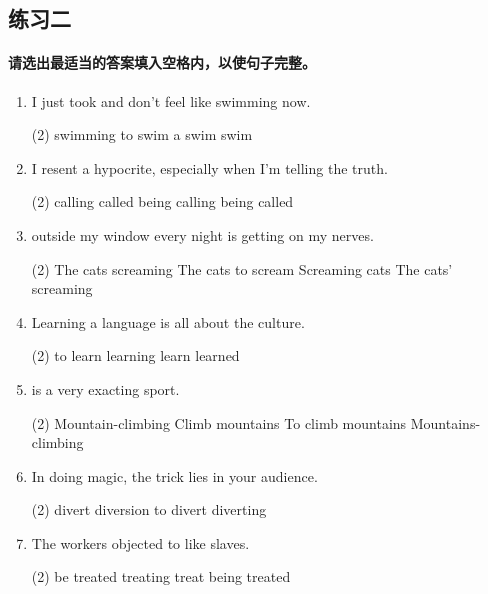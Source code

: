 \subsection{练习二}

\paragraph{请选出最适当的答案填入空格内，以使句子完整。}

\begin{enumerate}
\item I just took \ttu and don't feel like swimming now.
  \begin{tasks}(2)
    \task swimming
    \task to swim
    \task a swim
    \task swim
  \end{tasks}

\item I resent \ttu a hypocrite, especially when I'm telling the truth.
  \begin{tasks}(2)
    \task calling
    \task called
    \task being calling
    \task being called
  \end{tasks}

\item \ttu outside my window every night is getting on my nerves.
  \begin{tasks}(2)
    \task The cats screaming
    \task The cats to scream
    \task Screaming cats
    \task The cats' screaming
  \end{tasks}

\item Learning a language is \ttu all about the culture.
  \begin{tasks}(2)
    \task to learn
    \task learning
    \task learn
    \task learned
  \end{tasks}

\item \ttu is a very exacting sport.
  \begin{tasks}(2)
    \task Mountain-climbing
    \task Climb mountains
    \task To climb mountains
    \task Mountains-climbing
  \end{tasks}

\item In doing magic, the trick lies in \ttu your audience.
  \begin{tasks}(2)
    \task divert
    \task diversion
    \task to divert
    \task diverting
  \end{tasks}

\item The workers objected to \ttu like slaves.
  \begin{tasks}(2)
    \task be treated
    \task treating
    \task treat
    \task being treated
  \end{tasks}


\end{enumerate}
